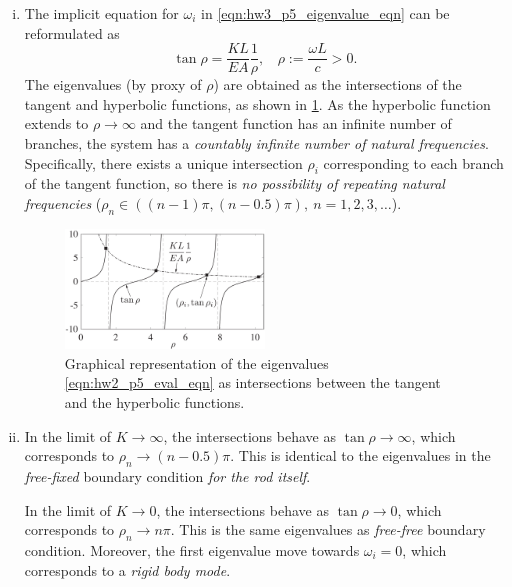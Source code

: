 \begin{enumerate}[(i)]
{    where $\rho_i := \omega_i L / c$ are the non-dimensionalized natural frequencies (see (ii)). 
}
\item { %
    The implicit equation for $\omega_i$ in \cref{eqn:hw3_p5_eigenvalue_eqn} can be reformulated as 
    \begin{equation}\label{eqn:hw2_p5_eval_eqn}
        \boxed{\tan \rho = \frac{KL}{EA} \frac{1}{\rho}, ~~~~ \rho := \frac{\omega L}{c} > 0}.
    \end{equation}
    The eigenvalues (by proxy of $\rho$) are obtained as the intersections of the tangent and hyperbolic functions, as shown in \cref{fig:hw2_p5_eval_eqn}.
    As the hyperbolic function extends to $\rho \rightarrow \infty$ and the tangent function has an infinite number of branches, the system has a \emph{countably infinite number of natural frequencies}.
    Specifically, there exists a unique intersection $\rho_i$ corresponding to each branch of the tangent function, so there is \emph{no possibility of repeating natural frequencies} ($\rho_n \in ((n-1)\pi, (n-0.5)\pi), ~n=1, 2, 3,\ldots$). 
    \begin{figure}[!ht]
        \centering
        \includegraphics[width=0.5\textwidth]{homework/hw2/assets/hw2_p5_eval_eqn.pdf}
        \caption{Graphical representation of the eigenvalues \cref{eqn:hw2_p5_eval_eqn} as intersections between the tangent and the hyperbolic functions.}
        \label{fig:hw2_p5_eval_eqn}
    \end{figure}
}
\item { %
    In the limit of $K \rightarrow \infty$, the intersections behave as $\tan \rho \rightarrow \infty$, which corresponds to $\rho_n \rightarrow (n - 0.5)\pi$.
    This is identical to the eigenvalues in the \emph{free-fixed} boundary condition \emph{for the rod itself}.

    In the limit of $K \rightarrow 0$, the intersections behave as $\tan \rho \rightarrow 0$, which corresponds to $\rho_n \rightarrow n\pi$. 
    This is the same eigenvalues as \emph{free-free} boundary condition. 
    Moreover, the first eigenvalue move towards $\omega_i = 0$, which corresponds to a \emph{rigid body mode}. 

}
\end{enumerate}
